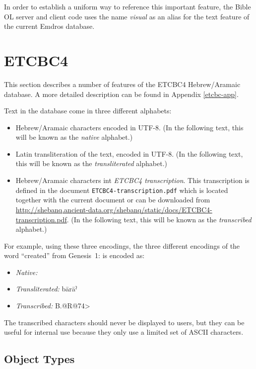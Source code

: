 \documentclass[11pt,oneside,a4paper]{memoir}
\newcommand*{\bibleref}[3]{#1~#2\thinspace:\thinspace#3}
\newcommand{\heb}[1]{{\RL {\ezr #1}}}
\begin{document}
In order to establish a uniform way to reference this important feature, the Bible OL server and
client code uses the name \emph{visual} as an alias for the text feature of the current Emdros
database.



\section{ETCBC4}

This section describes a number of features of the ETCBC4 Hebrew/Aramaic database. A more detailed
description can be found in Appendix \ref{etcbc-app}.

Text in the database come in three different alphabets:

\begin{itemize}
\item Hebrew/Aramaic characters encoded in UTF-8. (In the following text, this will be known as the
  \emph{native} alphabet.)
\item Latin transliteration of the text, encoded in UTF-8. (In the following text, this will be
  known as the \emph{transliterated} alphabet.)
\item Hebrew/Aramaic characters int \emph{ETCBC4 transcription}. This transcription is defined in
  the document \texttt{ETCBC4-transcription.pdf} which is located together with the current document
  or can be downloaded from
  \url{http://shebanq.ancient-data.org/shebanq/static/docs/ETCBC4-transcription.pdf}. (In the
  following text, this will be known as the \emph{transcribed} alphabet.)
\end{itemize}

For example, using these three encodings, the three different encodings of the word ``created'' from
\bibleref{Genesis}{1}{1} is encoded as:

\begin{itemize}
\item \emph{Native:} \heb{בָּרָ֣א}
\item \emph{Transliterated:} bārāˀ
\item \emph{Transcribed:} B.@R@74>
\end{itemize}

The transcribed characters should never be displayed to users, but they can be useful for internal
use because they only use a limited set of ASCII characters.


\subsection{Object Types}
\end{document}
